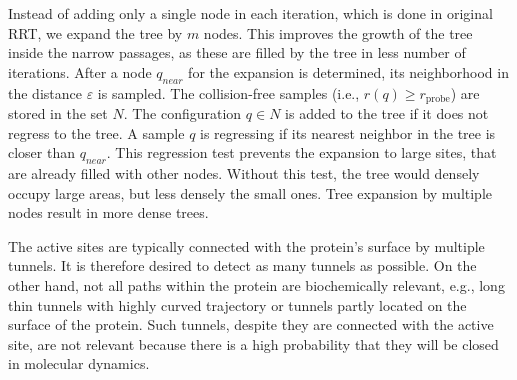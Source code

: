 \documentclass{llncs}
\def\qnear{q_{near}}
\def\qnew{q_{new}}
\def\probe{r_{\mathrm{probe}}}
\begin{document}
Instead of adding only a single node in each iteration, which is done in original RRT, we expand the tree by $m$ nodes.
This improves the growth of the tree inside the narrow passages, as these are filled by the tree in less number of iterations.
After a node $\qnear$ for the expansion is determined, its neighborhood in the distance $\varepsilon$ is sampled.
The collision-free samples (i.e., $r(q) \ge \probe$)  are stored in the set $N$.
The configuration $q \in N$ is added to the tree if it does not regress to the tree.
A sample $q$ is regressing if its nearest neighbor in the tree is closer than $\qnear$. %
This regression test prevents the expansion to large sites, that are already filled with other nodes. 
Without this test, the tree would densely occupy large areas, but less densely the small ones.
Tree expansion by multiple nodes result in more dense trees. 



The active sites are typically connected with the protein’s surface by multiple tunnels.
It is therefore desired to detect as many tunnels as possible. 
On the other hand, not all paths within the protein are biochemically relevant, e.g., long thin tunnels with highly curved trajectory or
tunnels partly located on the surface of the protein.
Such tunnels, despite they are connected with the active site, are not relevant because there is a 
high probability that they will be closed in molecular dynamics.
\end{document}
